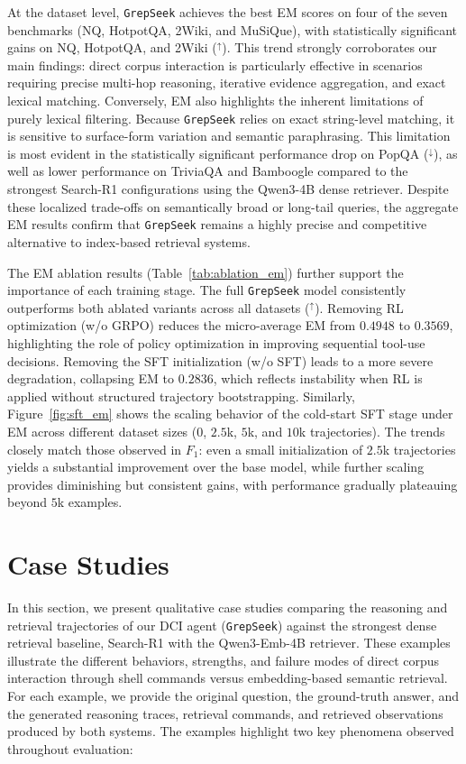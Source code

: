 \documentclass{article} %
\newcommand{\ourmethod}{\texttt{GrepSeek}\xspace}
\begin{document}
At the dataset level, \ourmethod{} achieves the best EM scores on four of the seven benchmarks (NQ, HotpotQA, 2Wiki, and MuSiQue), with statistically significant gains on NQ, HotpotQA, and 2Wiki ($^\uparrow$). This trend strongly corroborates our main findings: direct corpus interaction is particularly effective in scenarios requiring precise multi-hop reasoning, iterative evidence aggregation, and exact lexical matching. Conversely, EM also highlights the inherent limitations of purely lexical filtering. Because \ourmethod{} relies on exact string-level matching, it is sensitive to surface-form variation and semantic paraphrasing. This limitation is most evident in the statistically significant performance drop on PopQA ($^\downarrow$), as well as lower performance on TriviaQA and Bamboogle compared to the strongest Search-R1 configurations using the Qwen3-4B dense retriever. Despite these localized trade-offs on semantically broad or long-tail queries, the aggregate EM results confirm that \ourmethod{} remains a highly precise and competitive alternative to index-based retrieval systems.

The EM ablation results (Table~\ref{tab:ablation_em}) further support the importance of each training stage. The full \ourmethod{} model consistently outperforms both ablated variants across all datasets ($^\uparrow$). Removing RL optimization (w/o GRPO) reduces the micro-average EM from $0.4948$ to $0.3569$, highlighting the role of policy optimization in improving sequential tool-use decisions. Removing the SFT initialization (w/o SFT) leads to a more severe degradation, collapsing EM to $0.2836$, which reflects instability when RL is applied without structured trajectory bootstrapping. Similarly, Figure~\ref{fig:sft_em} shows the scaling behavior of the cold-start SFT stage under EM across different dataset sizes ($0$, $2.5$k, $5$k, and $10$k trajectories). The trends closely match those observed in $F_1$: even a small initialization of $2.5$k trajectories yields a substantial improvement over the base model, while further scaling provides diminishing but consistent gains, with performance gradually plateauing beyond $5$k examples.




\newpage
\section{Case Studies}
\label{app:case-studies}


In this section, we present qualitative case studies comparing the reasoning and retrieval trajectories of our DCI agent (\ourmethod{}) against the strongest dense retrieval baseline, Search-R1 with the Qwen3-Emb-4B retriever. These examples illustrate the different behaviors, strengths, and failure modes of direct corpus interaction through shell commands versus embedding-based semantic retrieval. For each example, we provide the original question, the ground-truth answer, and the generated reasoning traces, retrieval commands, and retrieved observations produced by both systems. The examples highlight two key phenomena observed throughout evaluation:
\end{document}
